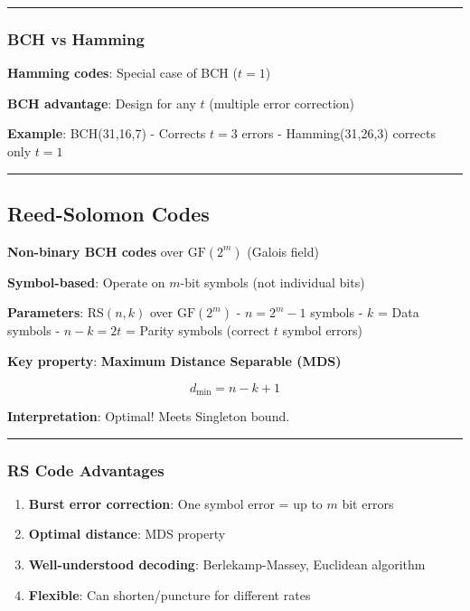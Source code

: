 \begin{center}\rule{0.5\linewidth}{0.5pt}\end{center}

\subsubsection{BCH vs Hamming}\label{bch-vs-hamming}

\textbf{Hamming codes}: Special case of BCH (\(t = 1\))

\textbf{BCH advantage}: Design for any \(t\) (multiple error correction)

\textbf{Example}: BCH(31,16,7) - Corrects \(t = 3\) errors -
Hamming(31,26,3) corrects only \(t = 1\)

\begin{center}\rule{0.5\linewidth}{0.5pt}\end{center}

\subsection{Reed-Solomon Codes}\label{reed-solomon-codes}

\textbf{Non-binary BCH codes} over \(\mathrm{GF}(2^m)\) (Galois field)

\textbf{Symbol-based}: Operate on \(m\)-bit symbols (not individual
bits)

\textbf{Parameters}: RS\((n, k)\) over \(\mathrm{GF}(2^m)\) -
\(n = 2^m - 1\) symbols - \(k\) = Data symbols - \(n - k = 2t\) = Parity
symbols (correct \(t\) symbol errors)

\textbf{Key property}: \textbf{Maximum Distance Separable (MDS)}

\[
d_{\min} = n - k + 1
\]

\textbf{Interpretation}: Optimal! Meets Singleton bound.

\begin{center}\rule{0.5\linewidth}{0.5pt}\end{center}

\subsubsection{RS Code Advantages}\label{rs-code-advantages}

\begin{enumerate}
\def\labelenumi{\arabic{enumi}.}
\tightlist
\item
  \textbf{Burst error correction}: One symbol error = up to \(m\) bit
  errors
\item
  \textbf{Optimal distance}: MDS property
\item
  \textbf{Well-understood decoding}: Berlekamp-Massey, Euclidean
  algorithm
\item
  \textbf{Flexible}: Can shorten/puncture for different rates
\end{enumerate}

